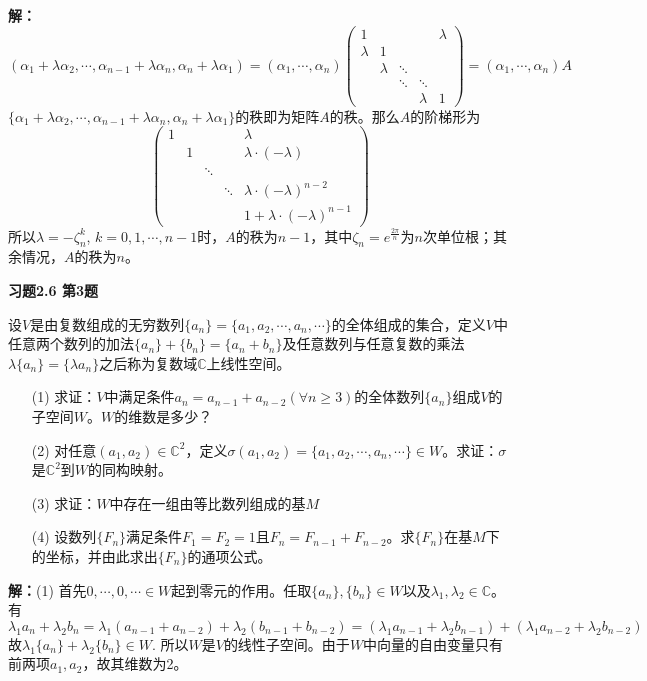 {\bf 解：}
$$(\alpha_1+\lambda\alpha_2, \cdots, \alpha_{n-1}+\lambda\alpha_n, \alpha_n+\lambda\alpha_1) = (\alpha_1,\cdots,\alpha_n) \begin{pmatrix}
1 & & & & \lambda \\ \lambda & 1 & & & \\ & \lambda & \ddots & & \\ & & \ddots & \ddots & \\ & & & \lambda & 1
\end{pmatrix} = (\alpha_1,\cdots,\alpha_n)A$$
$\{ \alpha_1+\lambda\alpha_2, \cdots, \alpha_{n-1}+\lambda\alpha_n, \alpha_n+\lambda\alpha_1 \}$的秩即为矩阵$A$的秩。那么$A$的阶梯形为
$$
\begin{pmatrix}
1 & & & & \lambda \\ & 1 & & & \lambda\cdot(-\lambda) \\ & & \ddots & & \\ & & & \ddots & \lambda\cdot(-\lambda)^{n-2} \\ & & & & 1 + \lambda\cdot(-\lambda)^{n-1}
\end{pmatrix}
$$
所以$\lambda = -\zeta_{n}^k$, $k=0,1,\cdots, n-1$时，$A$的秩为$n-1$，其中$\zeta_{n} = e^{\frac{2\pi}{n}}$为$n$次单位根；其余情况，$A$的秩为$n$。

\newpageorvspace

{\bf 习题2.6 第3题}

设$V$是由复数组成的无穷数列$\{a_n\} = \{ a_1,a_2,\cdots,a_n,\cdots \}$的全体组成的集合，定义$V$中任意两个数列的加法$\{a_n\} + \{b_n\} = \{a_n+b_n\}$及任意数列与任意复数的乘法$\lambda\{a_n\} = \{\lambda a_n\}$之后称为复数域$\mathbb{C}$上线性空间。
\begin{itemize}
\item[(1)] 求证：$V$中满足条件$a_n = a_{n-1}+a_{n-2} (\forall n \geqslant 3)$的全体数列$\{a_n\}$组成$V$的子空间$W$。$W$的维数是多少？
\item[(2)] 对任意$(a_1,a_2)\in\mathbb{C}^2$，定义$\sigma(a_1,a_2) = \{ a_1,a_2,\cdots,a_n,\cdots \} \in W$。求证：$\sigma$是$\mathbb{C}^2$到$W$的同构映射。
\item[(3)] 求证：$W$中存在一组由等比数列组成的基$M$
\item[(4)] 设数列$\{F_n\}$满足条件$F_1 = F_2 = 1$且$F_n = F_{n-1} + F_{n-2}$。求$\{F_n\}$在基$M$下的坐标，并由此求出$\{F_n\}$的通项公式。
\end{itemize}

{\bf 解：}(1) 首先${0,\cdots,0,\cdots}\in W$起到零元的作用。任取$\{a_n\} , \{b_n\} \in W$以及$\lambda_1,\lambda_2\in\mathbb{C}$。有
$$\lambda_1 a_n + \lambda_2 b_n = \lambda_1 (a_{n-1}+a_{n-2}) + \lambda_2 (b_{n-1}+b_{n-2}) = (\lambda_1 a_{n-1} + \lambda_2 b_{n-1}) + (\lambda_1 a_{n-2} + \lambda_2 b_{n-2})$$
故$\lambda_1\{a_n\} + \lambda_2\{b_n\} \in W$. 所以$W$是$V$的线性子空间。由于$W$中向量的自由变量只有前两项$a_1,a_2$，故其维数为2。

